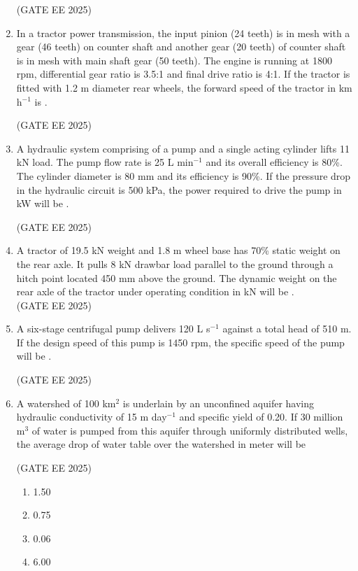 \documentclass[journal,12pt,onecolumn]{IEEEtran}
\theoremstyle{remark}
\begin{document}
\begin{enumerate}
\hfill(GATE EE 2025)
\newpage
\item In a tractor power transmission, the input pinion (24 teeth) is in mesh with a gear (46 teeth) on counter shaft and another gear (20 teeth) of counter shaft is in mesh with main shaft gear (50 teeth). The engine is running at 1800 rpm, differential gear ratio is 3.5:1 and final drive ratio is 4:1. If the tractor is fitted with 1.2 m diameter rear wheels, the forward speed of the tractor in km h$^{-1}$ is \underline{\hspace{2cm}}. 

\hfill(GATE EE 2025)

\item A hydraulic system comprising of a pump and a single acting cylinder lifts 11 kN load. The pump flow rate is 25 L min$^{-1}$ and its overall efficiency is 80\%. The cylinder diameter is 80 mm and its efficiency is 90\%. If the pressure drop in the hydraulic circuit is 500 kPa, the power required to drive the pump in kW will be \underline{\hspace{2cm}}.

\hfill(GATE EE 2025)

\item A tractor of 19.5 kN weight and 1.8 m wheel base has 70\% static weight on the rear axle. It pulls 8 kN drawbar load parallel to the ground through a hitch point located 450 mm above the ground. The dynamic weight on the rear axle of the tractor under operating condition in kN will be \underline{\hspace{2cm}}. \\

\hfill(GATE EE 2025)

\item A six-stage centrifugal pump delivers 120 L s$^{-1}$ against a total head of 510 m. If the design speed of this pump is 1450 rpm, the specific speed of the pump will be \underline{\hspace{2cm}}. 

\hfill(GATE EE 2025)

\item A watershed of 100 km$^2$ is underlain by an unconfined aquifer having hydraulic conductivity of 15 m day$^{-1}$ and specific yield of 0.20. If 30 million m$^3$ of water is pumped from this aquifer through uniformly distributed wells, the average drop of water table over the watershed in meter will be

\hfill(GATE EE 2025)

\begin{multicols}{4}
\begin{enumerate}
    \item 1.50
    \item 0.75
    \item 0.06
    \item 6.00
\end{enumerate}
\end{multicols}


\end{enumerate}
\end{document}
